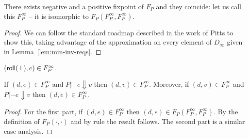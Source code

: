 \documentclass[preprint,nocopyrightspace,draft]{sigplanconf}
\begin{document}
\begin{lemma} There exists negative and a positive fixpoint of $F_{P}$ and they coincide: let us call this
$F_{P}^\infty$ -- it is isomorphic to $F_{P}(F_P^\infty,F_P^\infty)$.
\end{lemma}
\begin{proof}
We can follow the standard roadmap described in the work of Pitts to show this, taking 
advantage of the approximation on every element of $D_{\infty}$ given in 
Lemma~\ref{lem:min-inv-reqs}.
\end{proof}

\begin{lemma}\label{lem:bot-in-fix}
$(\mathsf{roll}(\bot),e) \in F_{P}^\infty$. \end{lemma}

\begin{lemma}\label{lem:eval-respecting}
If $(d,e) \in F_{P}^\infty$ and $P |- e \Downarrow v$ then $(d,v) \in F_{P}^\infty$.
Moreover, if $(d,v) \in F_{P}^\infty$ and $P |- e \Downarrow v$ then $(d,e) \in F_{P}^\infty$.
\end{lemma}
\begin{proof}
For the first part, 
if $(d,e) \in F_{P}^\infty$ then $(d,e) \in F_{P}(F_{P}^\infty,F_{P}^\infty)$. 
By the definition of $F_{P}(\cdot,\cdot)$ and by rule  the 
result follows. The second part is a similar case analysis.
\end{proof}
\end{document}
